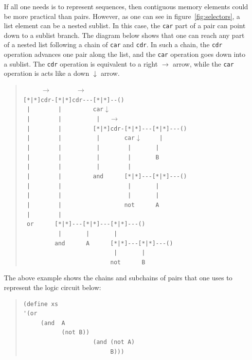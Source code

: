 \documentclass[a4paper,12pt]{book}
\newenvironment{fmpage}[1]
           {\begin{lrbox}{\fmbox}\begin{minipage}{#1}}
           {\end{minipage}\end{lrbox}\fbox{\usebox{\fmbox}}}
\begin{document}
\begin{fmpage}{0.8\linewidth}
\verb||
\end{fmpage}


If all one needs is to represent
sequences, then contiguous memory
elements could be more
practical than pairs. However, as one
can see in figure~\ref{fig:selectors},
a list element can be a nested sublist.
In this case, 
the \verb|car| part of a pair can point down to
a sublist branch. The diagram below shows
that one can reach any part of a nested
list following a chain of \verb|car| and \verb|cdr|.
In such a chain, the \verb|cdr| operation
advances one pair along the list, and
the \verb|car| operation goes down into a sublist.
The \verb|cdr| operation is equivalent to a
right $\rightarrow$  arrow, while the \verb|car|
operation is acts like a down $\downarrow$ arrow.
\begin{quote}
\verb"     "$\rightarrow$\verb"       "$\rightarrow$\\
\verb"[*|*]cdr-[*|*]cdr---[*|*]--()"\\
\verb" |        |         car"$\downarrow$\\
\verb" |        |          |  " $\rightarrow$\\
\verb" |        |         [*|*]cdr-[*|*]---[*|*]---()"\\
\verb" |        |          |       car"$\downarrow$\verb"     |"\\
\verb" |        |          |        |       |"\\
\verb" |        |          |        |       B"\\
\verb" |        |          |        |  "\\
\verb" |        |         and      [*|*]---[*|*]---()"\\
\verb" |        |                   |       |"\\
\verb" |        |                   |       |"\\
\verb" |        |                  not      A"\\
\verb" |        |"\\
\verb" or      [*|*]---[*|*]---[*|*]---()"\\          
\verb"          |       |       |"\\                     
\verb"         and      A      [*|*]---[*|*]---()"\\  
\verb"                          |       |"\\                     
\verb"                         not      B"                    
\end{quote}
The above example shows the chains and subchains of
pairs that one uses to represent the logic
circuit below:
\begin{quote}
\begin{verbatim}
(define xs
'(or 
     (and  A  
           (not B))
                    (and (not A)
                         B)))
\end{verbatim}
\end{quote}
\end{document}
